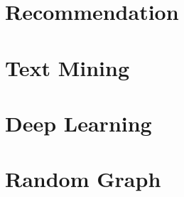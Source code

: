 \documentclass[11pt]{book}
\begin{document}
\chapter[Recommendation]
{Recommendation}

\chapter[Text Mining]
{Text Mining}

\chapter[Deep Learning]
{Deep Learning}


\chapter[Random Graph]
{Random Graph}







\end{document}
